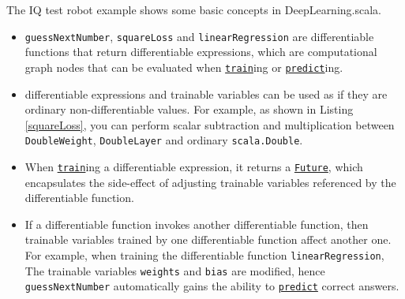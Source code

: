 The IQ test robot example shows some basic concepts in DeepLearning.scala.

\begin{itemize}
  \item \lstinline{guessNextNumber}, \lstinline{squareLoss} and \lstinline{linearRegression} are \glspl{differentiable function} that return \glspl{differentiable expression}, which are \gls{computational graph} nodes that can be evaluated when \href{https://javadoc.io/page/com.thoughtworks.deeplearning/deeplearning_2.11/latest/com/thoughtworks/deeplearning/DeepLearning.html\#train(differentiable:Differentiable)(implicitmonoid:algebra.ring.MultiplicativeMonoid[DeepLearning.this.Delta]):com.thoughtworks.future.Future[DeepLearning.this.Data]}{\lstinline{train}}ing or \href{https://javadoc.io/page/com.thoughtworks.deeplearning/deeplearning_2.11/latest/com/thoughtworks/deeplearning/DeepLearning.html\#predict(differentiable:Differentiable):com.thoughtworks.future.Future[DeepLearning.this.Data]}{\lstinline{predict}}ing.
  \item \Glspl{differentiable expression} and \glspl{trainable variable} can be used as if they are ordinary non-differentiable values. For example, as shown in Listing \ref{squareLoss}, you can perform scalar subtraction and multiplication between \lstinline{DoubleWeight}, \lstinline{DoubleLayer} and ordinary \lstinline{scala.Double}.
  \item When \href{https://javadoc.io/page/com.thoughtworks.deeplearning/deeplearning_2.11/latest/com/thoughtworks/deeplearning/DeepLearning.html\#train(differentiable:Differentiable)(implicitmonoid:algebra.ring.MultiplicativeMonoid[DeepLearning.this.Delta]):com.thoughtworks.future.Future[DeepLearning.this.Data]}{\lstinline{train}}ing a \gls{differentiable expression}, it returns a \href{https://javadoc.io/page/com.thoughtworks.future/future_2.11/latest/com/thoughtworks/future$$Future.html}{\lstinline{Future}}, which encapsulates the side-effect of adjusting \glspl{trainable variable} referenced by the \gls{differentiable function}.
  \item If a \gls{differentiable function} invokes another \gls{differentiable function}, then \glspl{trainable variable} trained by one \gls{differentiable function} affect another one. For example, when training the \gls{differentiable function} \lstinline{linearRegression}, The \glspl{trainable variable} \lstinline{weights} and \lstinline{bias} are modified, hence \lstinline{guessNextNumber} automatically gains the ability to \href{https://javadoc.io/page/com.thoughtworks.deeplearning/deeplearning_2.11/latest/com/thoughtworks/deeplearning/DeepLearning.html\#predict(differentiable:Differentiable):com.thoughtworks.future.Future[DeepLearning.this.Data]}{\lstinline{predict}} correct answers.
\end{itemize}

